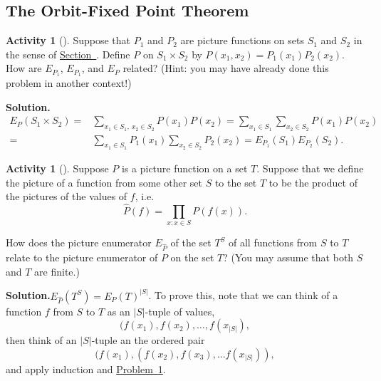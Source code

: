 \documentclass[10pt,]{book}
\theoremstyle{plain}
\theoremstyle{definition}
\newtheorem{activity}[project]{Activity}
\numberwithin{equation}{chapter}
\newcommand{\amp}{&}
\begin{document}
\subsection[{The Orbit-Fixed Point Theorem}]{The Orbit-Fixed Point Theorem}\label{subsection-68}
\begin{activity}[]\label{ProdPrincPictureEnumerators}
Suppose that \(P_1\) and \(P_2\) are picture functions on sets \(S_1\) and \(S_2\) in the sense of \hyperref[picturefunction]{Section~}. Define \(P\) on \(S_1 \times
S_2\) by \(P(x_1,x_2) = P_1(x_1)P_2(x_2)\). How are \(E_{P_1}\), \(E_{P_1}\), and \(E_{P}\) related? (Hint: you may have already done this problem in another context!)%
\par\medskip\noindent%
\textbf{Solution.}\quad %
\begin{align*}
E_P(S_1\times S_2) =\amp \sum_{x_1\in S_1,\ x_2\in
S_2}P(x_1)P(x_2)=\sum_{x_1\in S_1}\sum_{x_2 \in S_2}P(x_1)P(x_2)\\
=\amp  \sum_{x_1\in
S_1}P_1(x_1)\sum_{x_2 \in S_2}P_2(x_2)=E_{P_1}(S_1)E_{P_2}(S_2).
\end{align*}
\end{activity}
\begin{activity}[]\label{PictureEnumeratorforFunctions}
Suppose \(P\) is a picture function on a set \(T\). Suppose that we define the picture of a function from some other set \(S\) to the set \(T\) to be the product of the pictures of the values of \(f\), i.e.%
\begin{equation*}
\hat P(f) = \prod_{x:x\in S}P(f(x)).
\end{equation*}
%
\par
How does the picture enumerator \(E_{\hat P}\) of the set \(T^S\) of all functions from \(S\) to \(T\) relate to the picture enumerator of \(P\) on the set \(T\)? (You may assume that both \(S\) and \(T\) are finite.)%
\par\medskip\noindent%
\textbf{Solution.}\quad \(E_{\hat P}(T^S)=E_P(T)^{|S|}\). To prove this, note that we can think of a function \(f\) from \(S\) to \(T\) as an \(|S|\)-tuple of values,%
\begin{equation*}
(f(x_1),f(x_2),\ldots,
f(x_{|S|}),
\end{equation*}
then think of an \(|S|\)-tuple an the ordered pair%
\begin{equation*}
(f(x_1),(f(x_2),
f(x_3),\ldots f(x_{|S|})),
\end{equation*}
and apply induction and \hyperref[ProdPrincPictureEnumerators]{Problem~\ref{ProdPrincPictureEnumerators}}.%
\end{activity}
\end{document}
